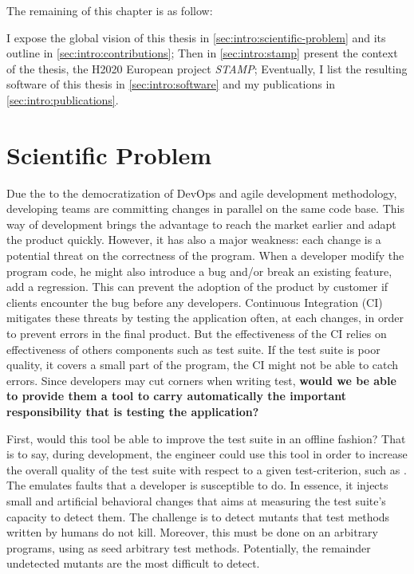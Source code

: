 The remaining of this chapter is as follow:

I expose the global vision  of this thesis in \autoref{sec:intro:scientific-problem} and its outline in \autoref{sec:intro:contributions};
Then in \autoref{sec:intro:stamp} present the context of the thesis, the H2020 European project \emph{STAMP};
Eventually, I list the resulting software of this thesis in \autoref{sec:intro:software} and my publications in \autoref{sec:intro:publications}.

\section{Scientific Problem}
\label{sec:intro:scientific-problem}

Due the to the democratization of DevOps and agile development methodology, developing teams are committing changes in parallel on the same code base.
This way of development brings the advantage to reach the market earlier and adapt the product quickly.
However, it has also a major weakness: each change is a potential threat on the correctness of the program.
When a developer modify the program code, he might also introduce a bug and/or break an existing feature, \ie add a regression.
This can prevent the adoption of the product by customer if clients encounter the bug before any developers.
Continuous Integration (CI) mitigates these threats by testing the application often, \eg at each changes, in order to prevent errors in the final product.
But the effectiveness of the CI relies on effectiveness of others components such as test suite.
If the test suite is poor quality, \eg it covers a small part of the program, the CI might not be able to catch errors.
Since developers may cut corners when writing test, \textbf{would we be able to provide them a tool to carry automatically the important responsibility that is testing the application?}

First, would this tool be able to improve the test suite in an offline fashion? 
That is to say, during development, the engineer could use this tool in order to increase the overall quality of the test suite with respect to a given test-criterion, such as \ms.
The \ms emulates faults that a developer is susceptible to do.
In essence, it injects small and artificial behavioral changes that aims at measuring the test suite's capacity to detect them.
The challenge is to detect mutants that test methods written by humans do not kill.
Moreover, this must be done on an arbitrary programs, using as seed arbitrary test methods.
Potentially, the remainder undetected mutants are the most difficult to detect.

